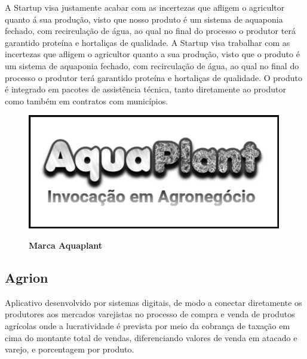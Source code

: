 A Startup visa justamente acabar com as incertezas que afligem o agricultor quanto á sua produção, visto que nosso produto é um sistema de aquaponia fechado, com recirculação de água, ao qual no final do processo o produtor terá garantido proteína e hortaliças de qualidade.
A Startup visa trabalhar com as incertezas que afligem o agricultor quanto a sua produção, visto que o produto é um sistema de aquaponia fechado, com recirculação de água, ao qual no final do processo o produtor terá garantido proteína e hortaliças de qualidade. O produto é integrado em pacotes de assistência técnica, tanto diretamente ao produtor como também em contratos com municípios.


\begin{figure}[H]
\centering
\caption{\textbf{Marca Aquaplant}}
\includegraphics[scale=0.5]{Imagens/aquaplant.png}
\label{figura_13}
\end{figure}


\subsection{Agrion}

Aplicativo desenvolvido por sistemas digitais, de modo a conectar diretamente os produtores aos mercados varejistas no processo de compra e venda de produtos agrícolas onde a lucratividade é prevista por meio da cobrança de taxação em cima do montante total de vendas, diferenciando valores de venda em atacado e varejo, e porcentagem por produto.


